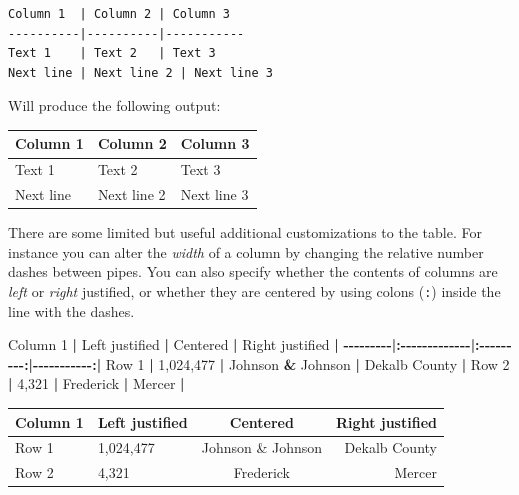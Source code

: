 \documentclass[
]{book}
\newenvironment{Shaded}{\begin{snugshade}}{\end{snugshade}}
\newcommand{\DecValTok}[1]{\textcolor[rgb]{0.00,0.00,0.81}{#1}}
\newcommand{\ErrorTok}[1]{\textcolor[rgb]{0.64,0.00,0.00}{\textbf{#1}}}
\newcommand{\NormalTok}[1]{#1}
\newcommand{\SpecialCharTok}[1]{\textcolor[rgb]{0.81,0.36,0.00}{\textbf{#1}}}
\begin{document}
\begin{verbatim}
Column 1  | Column 2 | Column 3
----------|----------|-----------
Text 1    | Text 2   | Text 3
Next line | Next line 2 | Next line 3
\end{verbatim}

Will produce the following output:

\begin{longtable}[]{@{}lll@{}}
\toprule\noalign{}
Column 1 & Column 2 & Column 3 \\
\midrule\noalign{}
\endhead
\bottomrule\noalign{}
\endlastfoot
Text 1 & Text 2 & Text 3 \\
Next line & Next line 2 & Next line 3 \\
\end{longtable}

There are some limited but useful additional customizations to the table. For instance you can alter the \emph{width} of a column by changing the relative number dashes between pipes. You can also specify whether the contents of columns are \emph{left} or \emph{right} justified, or whether they are centered by using colons (\texttt{:}) inside the line with the dashes.

\begin{Shaded}
\begin{Highlighting}[]
\NormalTok{Column }\DecValTok{1} \SpecialCharTok{|}\NormalTok{ Left justified }\SpecialCharTok{|}\NormalTok{ Centered }\SpecialCharTok{|}\NormalTok{ Right justified }\SpecialCharTok{|}
\SpecialCharTok{{-}{-}{-}{-}{-}{-}{-}{-}{-}}\ErrorTok{|:}\SpecialCharTok{{-}{-}{-}{-}{-}{-}{-}{-}{-}{-}{-}{-}{-}}\ErrorTok{|:}\SpecialCharTok{{-}{-}{-}{-}{-}{-}{-}{-}{-}}\ErrorTok{:|}\SpecialCharTok{{-}{-}{-}{-}{-}{-}{-}{-}{-}{-}{-}}\ErrorTok{:|}
\NormalTok{Row }\DecValTok{1}  \SpecialCharTok{|} \DecValTok{1}\NormalTok{,}\DecValTok{024}\NormalTok{,}\DecValTok{477} \SpecialCharTok{|}\NormalTok{ Johnson }\SpecialCharTok{\&}\NormalTok{ Johnson }\SpecialCharTok{|}\NormalTok{ Dekalb County }\SpecialCharTok{|}
\NormalTok{Row }\DecValTok{2} \SpecialCharTok{|} \DecValTok{4}\NormalTok{,}\DecValTok{321} \SpecialCharTok{|}\NormalTok{ Frederick }\SpecialCharTok{|}\NormalTok{ Mercer  }\SpecialCharTok{|}
\end{Highlighting}
\end{Shaded}

\begin{longtable}[]{@{}llcr@{}}
\toprule\noalign{}
Column 1 & Left justified & Centered & Right justified \\
\midrule\noalign{}
\endhead
\bottomrule\noalign{}
\endlastfoot
Row 1 & 1,024,477 & Johnson \& Johnson & Dekalb County \\
Row 2 & 4,321 & Frederick & Mercer \\
\end{longtable}
\end{document}
